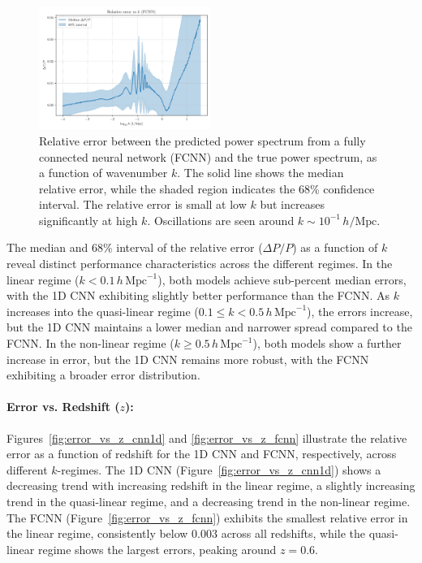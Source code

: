 \documentclass[twocolumn]{aastex631}
\begin{document}
\begin{figure}[h]
    \centering
    \includegraphics[width=0.5\textwidth]{Project4/plots/error_vs_k_fcnn_4_1745408320.png}
    \caption{\label{fig:error_vs_k_fcnn}Relative error between the predicted power spectrum from a fully connected neural network (FCNN) and the true power spectrum, as a function of wavenumber $k$. The solid line shows the median relative error, while the shaded region indicates the 68\% confidence interval. The relative error is small at low $k$ but increases significantly at high $k$. Oscillations are seen around $k \sim 10^{-1} \, h/\mathrm{Mpc}$.}
\end{figure}

The median and 68\% interval of the relative error ($\Delta P/P$) as a function of $k$ reveal distinct performance characteristics across the different regimes. In the linear regime ($k < 0.1\,h\,\mathrm{Mpc}^{-1}$), both models achieve sub-percent median errors, with the 1D CNN exhibiting slightly better performance than the FCNN. As $k$ increases into the quasi-linear regime ($0.1 \leq k < 0.5\,h\,\mathrm{Mpc}^{-1}$), the errors increase, but the 1D CNN maintains a lower median and narrower spread compared to the FCNN. In the non-linear regime ($k \geq 0.5\,h\,\mathrm{Mpc}^{-1}$), both models show a further increase in error, but the 1D CNN remains more robust, with the FCNN exhibiting a broader error distribution.

\paragraph{Error vs. Redshift ($z$):}

Figures~\ref{fig:error_vs_z_cnn1d} and \ref{fig:error_vs_z_fcnn} illustrate the relative error as a function of redshift for the 1D CNN and FCNN, respectively, across different $k$-regimes. The 1D CNN (Figure~\ref{fig:error_vs_z_cnn1d}) shows a decreasing trend with increasing redshift in the linear regime, a slightly increasing trend in the quasi-linear regime, and a decreasing trend in the non-linear regime. The FCNN (Figure~\ref{fig:error_vs_z_fcnn}) exhibits the smallest relative error in the linear regime, consistently below 0.003 across all redshifts, while the quasi-linear regime shows the largest errors, peaking around $z=0.6$.
\end{document}
